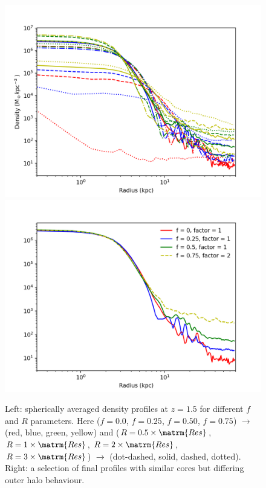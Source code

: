 \documentclass[a4paper,11pt]{article}
\begin{document}
\begin{figure}[!htb]
\centering
{}
  \includegraphics[trim={1cm 0 2cm 0.2cm},scale=0.55]{profiles_combined.png}
\endminipage\hfill
{}%
  \includegraphics[trim={1cm 0 2cm 0},scale=0.55]{profiles_selected.png}
\endminipage
\caption{Left: spherically averaged density profiles at $z=1.5$ for different $f$ and $R$ parameters. Here ($f = 0.0$, $f=0.25$, $f=0.50$, $f=0.75$) $\rightarrow$ (red, blue, green, yellow) and ($R=0.5\times\matrm{Res}$, $R=1\times\matrm{Res}$, $R=2\times\matrm{Res}$, $R=3\times\matrm{Res}$) $\rightarrow$ (dot-dashed, solid, dashed, dotted). Right: a selection of final profiles with similar cores but differing outer halo behaviour.}\label{fig:profiles_combined}
\end{figure}
\end{document}
